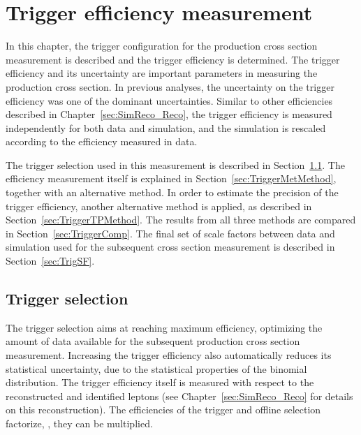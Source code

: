 
\chapter{Trigger efficiency measurement}
\label{sec:Trigger}

In this chapter, the trigger configuration for the \ttbar production cross section measurement is described and the trigger efficiency is determined.
The trigger efficiency and its uncertainty are important parameters in measuring the \ttbar
production cross section. In previous analyses, the uncertainty on the trigger efficiency was one of the dominant uncertainties.
Similar to other efficiencies described in Chapter~\ref{sec:SimReco_Reco}, the trigger efficiency
is measured independently for both data and simulation, and the simulation is rescaled according to the efficiency measured in data.

The trigger selection used in this measurement 
is described in  Section~\ref{sec:TriggerSel}. 
The efficiency measurement itself is explained in Section~\ref{sec:TriggerMetMethod}, together with an alternative method. In order to estimate the precision of the trigger efficiency, another alternative method is applied,
as described in Section~\ref{sec:TriggerTPMethod}. The results from all three methods are compared in Section~\ref{sec:TriggerComp}.
The final set of scale factors between data and simulation used for the subsequent \ttbar cross section measurement is described in Section~\ref{sec:TrigSF}. 



\section{Trigger selection} %
\label{sec:TriggerSel}

The trigger selection aims at reaching maximum efficiency, optimizing the amount of data available for the subsequent \ttbar production cross section measurement. 
Increasing the trigger efficiency also automatically reduces its statistical uncertainty, due to the statistical properties of the binomial distribution.
The trigger efficiency itself is measured with respect to the reconstructed and identified leptons (see Chapter~\ref{sec:SimReco_Reco} for details
on this reconstruction). The efficiencies of the trigger and offline selection factorize, \ie, they can be multiplied.


